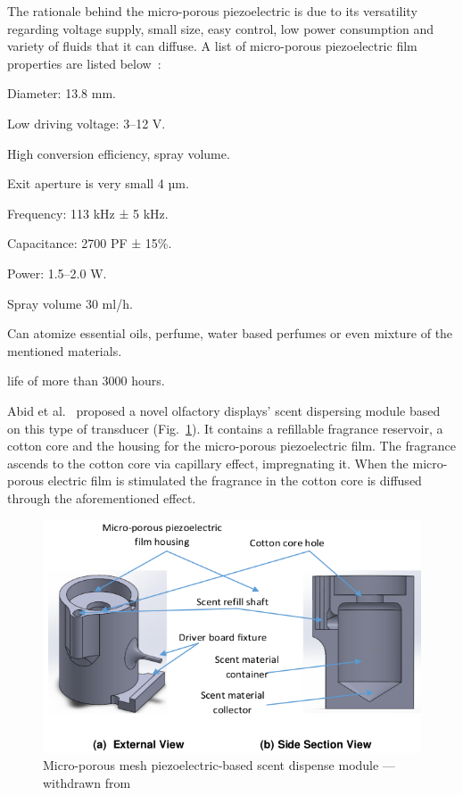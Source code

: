 The rationale behind the micro-porous piezoelectric is due to its
versatility regarding voltage supply, small size, easy control, low power
consumption and variety of fluids that it can diffuse.
A list of micro-porous piezoelectric film properties are listed below~\cite{wen2019development}:
\begin{enum-c}
\item Diameter: 13.8 mm.
\item Low driving voltage: 3--12 V.
\item High conversion efficiency, spray volume.
\item Exit aperture is very small 4 µm.
\item Frequency: 113 kHz ± 5 kHz.
\item Capacitance: 2700 PF ± 15\%.
\item Power: 1.5--2.0 W.
\item Spray volume 30 ml/h.
\item Can atomize essential oils, perfume, water based perfumes or even mixture
  of the mentioned materials.
\item life of more than 3000 hours.
\end{enum-c}

Abid et al.~\cite{abid2015novel} proposed a novel olfactory displays' scent
dispersing module based on this type of transducer
(Fig.~\ref{fig:novel-olfactory-scent-elem}). It contains a refillable fragrance
reservoir, a cotton core and the housing for the micro-porous piezoelectric
film. The fragrance ascends to the cotton core via capillary effect,
impregnating it. When the micro-porous electric film is stimulated the fragrance
in the cotton core is diffused through the aforementioned effect.
%
\begin{figure}[htb!]
\centering
    \includegraphics[width=0.65\columnwidth]{./img/novel-olfactory-scent-elem.png}
  \caption{Micro-porous mesh piezoelectric-based scent dispense module --- withdrawn from~\cite{abid2015novel}}%
\label{fig:novel-olfactory-scent-elem}
\end{figure}

